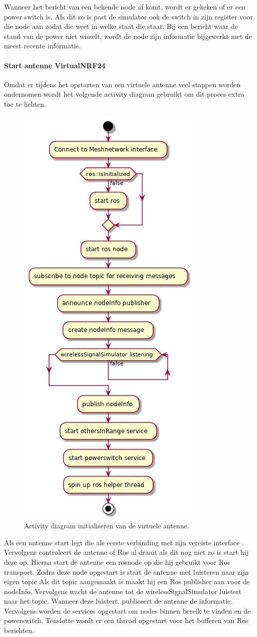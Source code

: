 \documentclass[a4paper, 11pt, oneside]{report}
\begin{document}
Wanneer het bericht van een bekende node af komt, wordt er gekeken of er een power switch is.
Als dit zo is past de simulator ook de switch in zijn register voor die node aan zodat die weet in welke staat die staat.
Bij een bericht waar de stand van de power niet wisselt, wordt de node zijn informatie bijgewerkt met de meest recente informatie.

\paragraph{Start antenne VirtualNRF24}
\label{DetailedDesign:ros:Activity:antenne}

Omdat er tijdens het opstarten van een virtuele antenne veel stappen worden ondernomen wordt het volgende activity diagram gebruikt om dit proces extra toe te lichten.

\begin{figure}[H]
	\begin{center}\includegraphics[width=.4\linewidth]{UML/out/ros/activity/StartAntenna/StartAntenna.png}\end{center}
	\caption{Activity diagram initialiseren van de virtuele antenne.}
	\label{fig:ros:MeshNetwerk:Activity:antenne}
\end{figure}

Als een antenne start legt die als eerste verbinding met zijn vereiste interface . 
Vervolgens controleert de antenne of Ros al draait als dit nog niet zo is start hij deze op.
Hierna start de antenne een rosnode op die hij gebruikt voor Ros transport.
Zodra deze node opgestart is start de antenne met luisteren naar zijn eigen topic
Als dit topic aangemaakt is maakt hij een Ros publisher aan voor de nodeInfo.  
Vervolgens wacht de antenne tot de wirelessSignalSimulator luistert naar het topic.
Wanneer deze luistert, publiceert de antenne de informatie.
Vervolgens worden de services opgestart om nodes binnen bereik te vinden en de powerswitch.
Tenslotte wordt er een thread opgestart voor het bufferen van Ros berichten.
\end{document}
